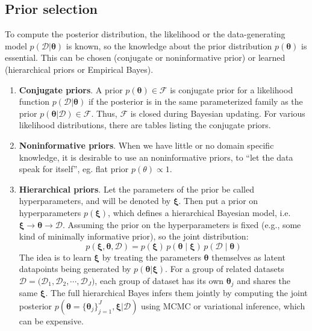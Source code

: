 \documentclass[11pt]{article}
\begin{document}
\subsection{Prior selection}
To compute the posterior distribution, the likelihood or the data-generating model $p(\mathcal{D} | \boldsymbol{\theta})$ is known, so the knowledge about the prior distribution $p(\boldsymbol{\theta})$ is essential. This can be chosen (conjugate or noninformative prior) or learned (hierarchical priors or Empirical Bayes).

\begin{enumerate}
    \item \textbf{Conjugate priors}. A prior $p(\boldsymbol{\theta}) \in \mathcal{F}$ is conjugate prior for a likelihood function $p(\mathcal{D} | \boldsymbol{\theta})$ 
    if the posterior is in the same parameterized family as the prior $p(\boldsymbol{\theta}|\mathcal{D}) \in \mathcal{F}$.
    Thus, $\mathcal{F}$ is closed during Bayesian updating. For various likelihood distributions, there are tables listing the conjugate priors.
    \item \textbf{Noninformative priors}. When we have little or no domain specific knowledge, it is desirable to use an noninformative priors, to ``let the data speak for itself'', eg. flat prior $p(\theta) \propto 1$.
    \item \textbf{Hierarchical priors}. Let the parameters of the prior be called hyperparameters, and will be denoted by $\boldsymbol{\xi}$. Then put a prior on hyperparameters $p(\boldsymbol{\xi})$, which defines a hierarchical Bayesian model, i.e. $\boldsymbol{\xi} \to \boldsymbol{\theta} \to \mathcal{D}$. 
    Assuming the prior on the hyperparameters is fixed (e.g., some kind of minimally informative prior), so the joint distribution:
    \[
    p(\boldsymbol{\xi}, \boldsymbol{\theta}, \mathcal{D}) = p(\boldsymbol{\xi})\, p(\boldsymbol{\theta} \mid \boldsymbol{\xi})\, p(\mathcal{D} \mid \boldsymbol{\theta})
    \]
    The idea is to learn $\boldsymbol{\xi}$ by treating the parameters $\boldsymbol{\theta}$ themselves as latent datapoints being generated by $p(\boldsymbol{\theta} | \boldsymbol{\xi})$.
    For a group of related datasets $\mathcal{D} = \big(\mathcal{D}_1, \mathcal{D}_2, \cdots, \mathcal{D}_J \big)$, each group of dataset has its own $\boldsymbol{\theta}_j$ and shares the same $\boldsymbol{\xi}$. 
    The full hierarchical Bayes infers them jointly by computing the joint posterior $p(\boldsymbol{\theta}=\{ \boldsymbol{\theta}_j\}_{j=1}^J, \boldsymbol{\xi} | \mathcal{D})$ using MCMC or variational inference, which can be expensive.

\end{enumerate}
\end{document}

